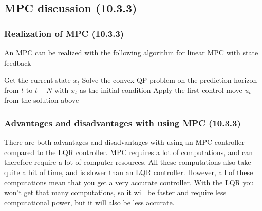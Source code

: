 \subsection{MPC discussion (10.3.3)}

\subsubsection{Realization of MPC (10.3.3)}
An MPC can be realized with the following algorithm for linear MPC with state feedback

\begin{algorithmic}
\State Get the current state $x_t$
\State Solve the convex QP problem on the prediction horizon from $t$ to $t+N$ with $x_t$ as the initial condition
\State Apply the first control move $u_t$ from the solution above
\EndFor
\end{algorithmic}

\subsubsection{Advantages and disadvantages with using MPC (10.3.3)}
There are both advantages and disadvantages with using an MPC controller compared to the LQR controller.   
MPC requires a lot of computations, and can therefore require a lot of computer resources. All these computations also take quite a bit of time, and is slower than an LQR controller. 
However, all of these computations mean that you get a very accurate controller. 
With the LQR you won't get that many computations, so it will be faster and require less computational power, but it will also be less accurate.

